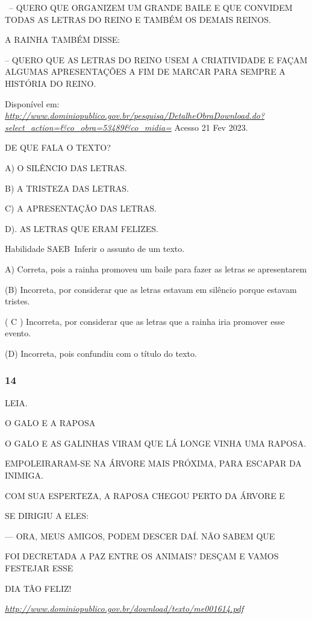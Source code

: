 \begin{escola}
~-- QUERO QUE ORGANIZEM UM GRANDE BAILE E QUE CONVIDEM TODAS AS LETRAS
DO REINO E TAMBÉM OS DEMAIS REINOS.

A RAINHA TAMBÉM DISSE:

-- QUERO QUE AS LETRAS DO REINO USEM A CRIATIVIDADE E FAÇAM ALGUMAS
APRESENTAÇÕES A FIM DE MARCAR PARA SEMPRE A HISTÓRIA DO REINO.

Disponível em:
\href{http://www.dominiopublico.gov.br/pesquisa/DetalheObraDownload.do?select_action=\&co_obra=53489\&co_midia=}{\emph{http://www.dominiopublico.gov.br/pesquisa/DetalheObraDownload.do?select\_action=\&co\_obra=53489\&co\_midia=}}
Acesso 21 Fev 2023.

DE QUE FALA O TEXTO?

A) O SILÊNCIO DAS LETRAS.

B) A TRISTEZA DAS LETRAS.

C) A APRESENTAÇÃO DAS LETRAS.

D). AS LETRAS QUE ERAM FELIZES.

Habilidade SAEB~Inferir o assunto de um texto.

A) Correta, pois a rainha promoveu um baile para fazer as letras se
apresentarem

(B) Incorreta, por considerar que as letras estavam em silêncio porque
estavam tristes.

( C ) Incorreta, por considerar que as letras que a rainha iria promover
esse evento.

(D) Incorreta, pois confundiu com o título do texto.

\subsubsection{14}\label{section-86}

LEIA.

O GALO E A RAPOSA

O GALO E AS GALINHAS VIRAM QUE LÁ LONGE VINHA UMA RAPOSA.

EMPOLEIRARAM-SE NA ÁRVORE MAIS PRÓXIMA, PARA ESCAPAR DA INIMIGA.

COM SUA ESPERTEZA, A RAPOSA CHEGOU PERTO DA ÁRVORE E

SE DIRIGIU A ELES:

--- ORA, MEUS AMIGOS, PODEM DESCER DAÍ. NÃO SABEM QUE

FOI DECRETADA A PAZ ENTRE OS ANIMAIS? DESÇAM E VAMOS FESTEJAR ESSE

DIA TÃO FELIZ!

\href{http://www.dominiopublico.gov.br/download/texto/me001614.pdf}{\emph{http://www.dominiopublico.gov.br/download/texto/me001614.pdf}}


\end{escola}
